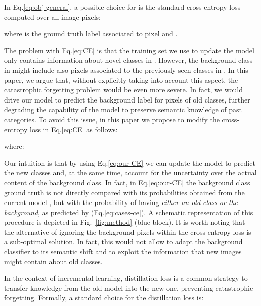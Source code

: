  In Eq.\eqref{eq:obj-general}, a possible choice for  is the standard cross-entropy loss computed over all image pixels: 
 
where  is the ground truth label associated to pixel  and . 

The problem with Eq.\eqref{eq:CE} is that the training set  we use to update the model only contains information about novel classes in . However, the background class in  might include also pixels associated to the previously seen classes in . In this paper, we argue that, without explicitly taking into account this aspect, the catastrophic forgetting problem would be even more severe. In fact, we would drive our model to predict the background label  for pixels of old classes, further degrading the capability of the model to preserve semantic knowledge of past categories. To avoid this issue, in this paper we propose to modify the cross-entropy loss in Eq.\eqref{eq:CE} as follows: 

 where:


Our intuition is that by using Eq.\eqref{eq:our-CE} we can update the model to predict the new classes and, at the same time, account for the uncertainty over the actual content of the background class. In fact, in Eq.\eqref{eq:our-CE} the background class ground truth is not directly compared with its probabilities  obtained from the current model , but with the probability of having \textit{either an old class or the background}, as predicted by  (Eq.\eqref{eq:cases-ce}). {A schematic representation of this procedure is depicted in Fig.~\ref{fig:method} (blue block).}
It is worth noting that the alternative of ignoring the background pixels within the cross-entropy loss is a sub-optimal solution. In fact, this would not allow to adapt the background classifier to its semantic shift and to exploit the information that new images might contain about old classes. 





















 In the context of incremental learning, distillation loss \cite{hinton2015distilling} is a common strategy to transfer knowledge from the old model  into the new one, preventing catastrophic forgetting. Formally, a standard choice for the distillation loss  is:

